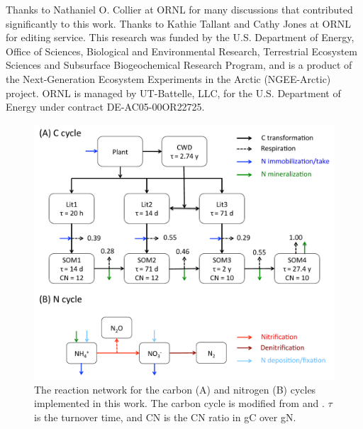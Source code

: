 \documentclass[gmd, manuscript]{copernicus}
\begin{document}
\begin{acknowledgements}
Thanks to Nathaniel O. Collier at ORNL for many discussions that contributed significantly to this work.
Thanks to Kathie Tallant and Cathy Jones at ORNL for editing service. This research was funded by the U.S. Department of Energy, Office of Sciences,
Biological and Environmental Research, Terrestrial Ecosystem Sciences and
Subsurface Biogeochemical Research Program, and is a product of the
Next-Generation Ecosystem Experiments in the Arctic (NGEE-Arctic) project.
ORNL is managed by UT-Battelle, LLC, for the U.S. Department of Energy under
contract DE-AC05-00OR22725.
\end{acknowledgements}











%

\clearpage
\begin{figure}[t]
\includegraphics[width=15cm]{../figs/fig01/fig01conceptualmodel.pdf}
\caption{The reaction network for the carbon (A) and nitrogen (B) cycles implemented in this work. The carbon cycle is modified from \citet{Thornton2005} and \citet{Bonan2012}. $\tau$ is the turnover time, and CN is the CN ratio in gC over gN.}
\label{fig:conceptualmodel}
\end{figure}
\end{document}
